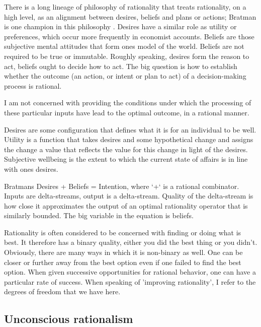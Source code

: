 There is a long lineage of philosophy of rationality that treats rationality, on a high level, as an alignment between desires, beliefs and plans or actions; Bratman is one champion in this philosophy \cite{Bratman1987}. Desires have a similar role as utility or preferences, which occur more frequently in economist accounts. Beliefs are those subjective mental attitudes that form ones model of the world. Beliefs are not required to be true or immutable. Roughly speaking, desires form the reason to act, beliefs ought to decide how to act. The big question is how to establish whether the outcome (an action, or intent or plan to act) of a decision-making process is rational.

I am not concerned with providing the conditions under which the processing of these particular inputs have lead to the optimal outcome, in a rational manner.

Desires are some configuration that defines what it is for an individual to be well. Utility is a function that takes desires and some hypothetical change and assigns the change a value that reflects the value for this change in light of the desires. Subjective wellbeing is the extent to which the current state of affairs is in line with ones desires.

Bratmans Desires + Beliefs = Intention, where `+` is a rational combinator. Inputs are delta-streams, output is a delta-stream. Quality of the delta-stream is how close it approximates the output of an optimal rationality operator that is similarly bounded. The big variable in the equation is beliefs.

Rationality is often considered to be concerned with finding or doing what is best. It therefore has a binary quality, either you did the best thing or you didn't. Obviously, there are many ways in which it is non-binary as well. One can be closer or further away from the best option even if one failed to find the best option. When given successive opportunities for rational behavior, one can have a particular rate of success. When speaking of 'improving rationality', I refer to the degrees of freedom that we have here.

\subsection{Unconscious rationalism}

